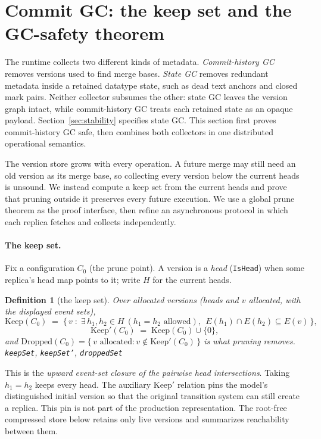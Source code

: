 \documentclass[11pt]{article}
\newtheorem{definition}[theorem]{Definition}
\newcommand{\lean}[1]{\texttt{#1}}
\begin{document}
\section{Commit GC: the keep set and the GC-safety theorem}
\label{sec:gc}

The runtime collects two different kinds of metadata.  \emph{Commit-history
GC} removes versions used to find merge bases.  \emph{State GC} removes
redundant metadata inside a retained datatype state, such as dead text anchors
and closed mark pairs.  Neither collector subsumes the other: state GC leaves
the version graph intact, while commit-history GC treats each retained state
as an opaque payload.  Section~\ref{sec:stability} specifies state GC.  This
section first proves commit-history GC safe, then combines both collectors in
one distributed operational semantics.

The version store grows with every operation.  A future merge may still need
an old version as its merge base, so collecting every version below the current
heads is unsound.  We instead compute a keep set from the current heads and
prove that pruning outside it preserves every future execution.  We use a
global prune theorem as the proof interface, then refine an asynchronous
protocol in which each replica fetches and collects independently.

\paragraph{The keep set.} Fix a configuration $C_0$ (the prune point).
A version is a \emph{head} (\lean{IsHead}) when some replica's head map
points to it; write $H$ for the current heads.

\begin{definition}[the keep set]
\label{def:keepset}
Over allocated versions (heads and $v$ allocated, with the displayed
event sets),
\[
  \mathrm{Keep}(C_0) \;=\; \bigl\{\, v \;:\; \exists\, h_1, h_2 \in H
  \ (h_1 = h_2 \text{ allowed}),\ \ E(h_1) \cap E(h_2) \subseteq E(v)
  \,\bigr\},
\]
\[
  \mathrm{Keep}'(C_0) \;=\; \mathrm{Keep}(C_0) \cup \{0\},
\]
and $\mathrm{Dropped}(C_0) = \{\, v \text{ allocated} : v \notin
\mathrm{Keep}'(C_0) \,\}$ is what pruning removes.
\hfill\lean{keepSet}, \lean{keepSet'}, \lean{droppedSet}
\end{definition}

This is the \emph{upward event-set closure of the pairwise head
intersections}.  Taking $h_1=h_2$ keeps every head.  The auxiliary
$\mathrm{Keep}'$ relation pins the model's distinguished initial version so
that the original transition system can still create a replica.  This pin is
not part of the production representation.  The root-free compressed store
below retains only live versions and summarizes reachability between them.
\end{document}
